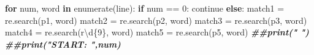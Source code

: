 \documentclass[
  12pt,
]{article}
\newenvironment{Shaded}{\begin{snugshade}}{\end{snugshade}}
\newcommand{\ControlFlowTok}[1]{\textcolor[rgb]{0.13,0.29,0.53}{\textbf{#1}}}
\newcommand{\DecValTok}[1]{\textcolor[rgb]{0.00,0.00,0.81}{#1}}
\newcommand{\DocumentationTok}[1]{\textcolor[rgb]{0.56,0.35,0.01}{\textbf{\textit{#1}}}}
\newcommand{\FunctionTok}[1]{\textcolor[rgb]{0.00,0.00,0.00}{#1}}
\newcommand{\NormalTok}[1]{#1}
\newcommand{\OtherTok}[1]{\textcolor[rgb]{0.56,0.35,0.01}{#1}}
\newcommand{\SpecialCharTok}[1]{\textcolor[rgb]{0.00,0.00,0.00}{#1}}
\newcommand{\StringTok}[1]{\textcolor[rgb]{0.31,0.60,0.02}{#1}}
\begin{document}
\begin{Shaded}
\begin{Highlighting}[]
    \ControlFlowTok{for}\NormalTok{ num, word }\ControlFlowTok{in} \FunctionTok{enumerate}\NormalTok{(line)}\SpecialCharTok{:}
            \ControlFlowTok{if}\NormalTok{ num }\SpecialCharTok{==} \DecValTok{0}\SpecialCharTok{:}
\NormalTok{                continue}
            \ControlFlowTok{else}\SpecialCharTok{:}
\NormalTok{                match1 }\OtherTok{=} \FunctionTok{re.search}\NormalTok{(p1, word)}
\NormalTok{                match2 }\OtherTok{=} \FunctionTok{re.search}\NormalTok{(p2, word)}
\NormalTok{                match3 }\OtherTok{=} \FunctionTok{re.search}\NormalTok{(p3, word)}
\NormalTok{                match4 }\OtherTok{=} \FunctionTok{re.search}\NormalTok{(r}\StringTok{\textquotesingle{}\textbackslash{}d\{9\}\textquotesingle{}}\NormalTok{, word)}
\NormalTok{                match5 }\OtherTok{=} \FunctionTok{re.search}\NormalTok{(p5, word)}
                \DocumentationTok{\#\#print("   ")}
                \DocumentationTok{\#\#print("START: ",num)}


\end{Highlighting}
\end{Shaded}
\end{document}
